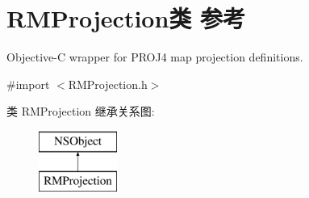 \hypertarget{interface_r_m_projection}{\section{R\-M\-Projection类 参考}
\label{interface_r_m_projection}
}


Objective-\/\-C wrapper for P\-R\-O\-J4 map projection definitions.  




{\ttfamily \#import $<$R\-M\-Projection.\-h$>$}

类 R\-M\-Projection 继承关系图\-:\begin{figure}[H]
\begin{center}
\leavevmode
\includegraphics[height=2.000000cm]{interface_r_m_projection}
\end{center}
\end{figure}
